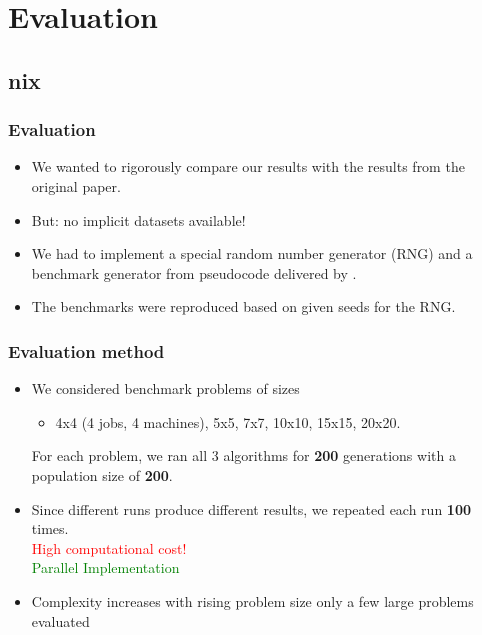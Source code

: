 \section{Evaluation}

\subsection{nix}
\begin{frame}
  \frametitle{Evaluation}
\begin{itemize}

	\item We wanted to rigorously compare our results with the results from the original paper.
	\item But: no implicit datasets available!

	\item We had to implement a special random number generator (RNG) and a benchmark generator from pseudocode delivered by \cite[Taillard'03]{Benchmarks}.

	\item The benchmarks were reproduced based on given seeds for the RNG.
\end{itemize}

\end{frame}


\begin{frame}
	\frametitle{Evaluation method}
\begin{itemize}

	\item We considered benchmark problems of sizes
		\begin{itemize}
		
			\item 4x4 (4 jobs, 4 machines), 5x5, 7x7, 10x10, 15x15, 20x20. 
		\end{itemize}
		
	For each problem, we  ran all 3 algorithms for \textbf{200} generations with a population size of \textbf{200}.

	\item 	Since different runs produce different results, we repeated each run \textbf{100} times. 
	\\ 		\textcolor{red}{\textrightarrow		High computational cost!}
    \\      \textcolor{green}{\textrightarrow   Parallel Implementation}

	\item 	Complexity increases with rising problem size \textrightarrow	only a few large problems evaluated 
\end{itemize}

	
\end{frame}

